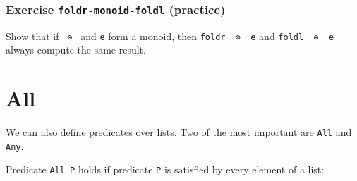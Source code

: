\begin{fence}
\begin{code}%
\>[0]\<%
\end{code}
\end{fence}

\hypertarget{exercise-foldr-monoid-foldl-practice}{%
\subsubsection{\texorpdfstring{Exercise \texttt{foldr-monoid-foldl}
(practice)}{Exercise foldr-monoid-foldl (practice)}}\label{exercise-foldr-monoid-foldl-practice}}

Show that if \texttt{\_⊗\_} and \texttt{e} form a monoid, then
\texttt{foldr\ \_⊗\_\ e} and \texttt{foldl\ \_⊗\_\ e} always compute the
same result.

\begin{fence}
\begin{code}%
\>[0]\<%
\end{code}
\end{fence}

\hypertarget{Lists-All}{%
\section{All}\label{Lists-All}}

We can also define predicates over lists. Two of the most important are
\texttt{All} and \texttt{Any}.

Predicate \texttt{All\ P} holds if predicate \texttt{P} is satisfied by
every element of a list:

